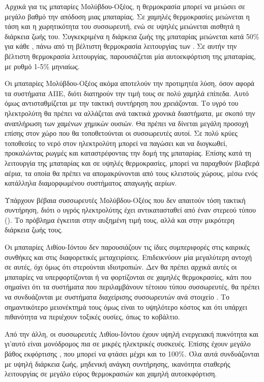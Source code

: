 \documentclass[12pt]{report}
\begin{document}
Αρχικά για τις μπαταρίες Μολύβδου-Οξέος, η θερμοκρασία μπορεί να μειώσει σε μεγάλο βαθμό την απόδοση μιας μπαταρίας. Σε χαμηλές θερμοκρασίες μειώνεται η τάση και η χωρητικότητα του συσσωρευτή, 
ενώ σε υψηλές μειώνεται αισθητά η διάρκεια ζωής του. Συγκεκριμένα 
η διάρκεια ζωής της μπαταρίας μειώνεται κατά 50\% για κάθε {}, πάνω από τη βέλτιστη θερμοκρασία λειτουργίας των {}. Σε αυτήν την βέλτιστη θερμοκρασία λειτουργίας, παρουσιάζεται
μία αυτοεκφόρτιση της μπαταρίας, με ρυθμό 1-5\% μηνιαίως.

Οι μπαταρίες Μολύβδου-Οξέος ακόμα αποτελούν την προτιμητέα λύση, όσον αφορά τα συστήματα ΑΠΕ, διότι διατηρούν την τιμή τους σε πολύ χαμηλά επίπεδα. Αυτό όμως αντισταθμίζεται με την τακτική συντήρηση που χρειάζονται. 
Το υγρό του ηλεκτρολύτη θα πρέπει να αλλάζεται ανά τακτικά χρονικά διαστήματα, με σκοπό την αναπλήρωση των χαμένων χημικών ουσιών. Θα πρέπει να δίνεται μεγάλη προσοχή επίσης στον χώρο που θα τοποθετούνται οι συσσωρευτές αυτοί.
Σε πολύ κρύες τοποθεσίες το νερό στον ηλεκτρολύτη μπορεί να παγώσει και να διογκωθεί, προκαλώντας ρωγμές και καταστρέφοντας την δομή της μπαταρίας. Επίσης κατά τη λειτουργία της μπαταρίας και σε υψηλές θερμοκρασίες, μπορεί να
παραχθούν βλαβερά αέρια, τα οποία θα πρέπει να απομακρύνονται από τους κλειστούς χώρους, μέσω ενός κατάλληλα διαμορφωμένου συστήματος απαγωγής αερίων.
 
Υπάρχουν βέβαια συσσωρευτές Μολύβδου-Οξέος που δεν απαιτούν τόση τακτική συντήρηση, διότι ο υγρός ηλεκτρολύτης έχει αντικατασταθεί από έναν στερεού τύπου ({}). Το πρόβλημα έγκειται στην αυξημένη τιμή τους, αλλά
και στην μικρότερη διάρκεια ζωής τους. 

Οι μπαταρίες Λιθίου-Ιόντου δεν παρουσιάζουν τις ίδιες συμπεριφορές στις καιρικές συνθήκες και στις διαφορετικές μεταχειρίσεις. Επιδεικνύουν μία μεγαλύτερη αντοχή σε αυτές, όχι όμως ότι στερούνται ιδιοτροπιών. 
Δεν θα πρέπει αρχικά αυτές οι μπαταρίες να υπερφορτίζονται ή να φορτίζονται σε χαμηλές θερμοκρασίες, κάτι που σημαίνει ότι τα συστήματα που περιλαμβάνουν τέτοιου τύπου συσσωρευτές, θα πρέπει να συνδυάζονται με συστήματα
διαχείρισης συσσωρευτών ανά στοιχείο {}. Το σημαντικότερο μειονέκτημά τους όμως είναι το υψηλότερο κόστος και ότι υπάρχει πιθανότητα να περιέχουν τοξικές ουσίες, όπως το κοβάλτιο.

Από την άλλη, οι συσσωρευτές Λιθίου-Ιόντου έχουν υψηλή ενεργειακή πυκνότητα και γι'αυτό είναι μονόδρομος πια σε μικρές ηλεκτρικές συσκευές. Επίσης έχουν μεγάλο βάθος εκφόρτισης {}, που μπορεί
να φτάσει μέχρι και το 100\%. Όλα αυτά συνδυάζονται με υψηλή διάρκεια ζωής, μηδενική ανάγκη συντήρησης, ικανότητα σταθερής λειτουργίας σε μεγάλο εύρος θερμοκρασιών και χαμηλή αυτοεκφόρτιση.
\end{document}
